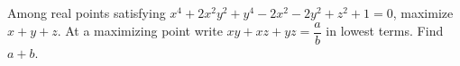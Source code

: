 Among real points satisfying $x^4+2x^2y^2+y^4-2x^2-2y^2+z^2+1=0$, maximize $x+y+z$. At a maximizing point write $xy+xz+yz=\dfrac{a}{b}$ in lowest terms. Find $a+b$.
